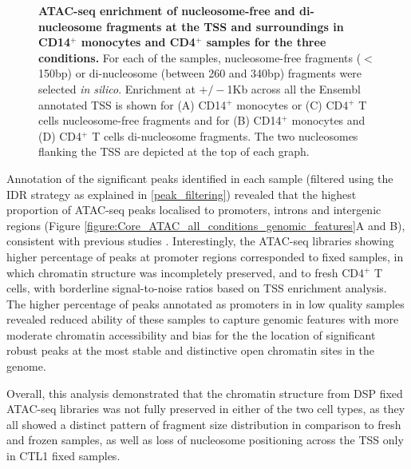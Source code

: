 \begin{figure}[htbp]
\caption[ATAC-seq enrichment of nucleosome-free and di-nucleosome fragments at the TSS and surroundings in CD14$^+$ monocytes and CD4$^+$ samples for the three conditions.]{\textbf{ATAC-seq enrichment of nucleosome-free and di-nucleosome fragments at the TSS and surroundings in CD14$^+$ monocytes and CD4$^+$ samples for the three conditions.} For each of the samples, nucleosome-free fragments ($<$150bp) or di-nucleosome (between 260 and 340bp) fragments were selected \textit{in silico}. Enrichment at $+/-$1Kb across all the Ensembl annotated TSS is shown for (A) CD14$^+$ monocytes or (C) CD4$^+$ T cells nucleosome-free fragments and for (B) CD14$^+$ monocytes and (D) CD4$^+$ T cells di-nucleosome fragments. The two nucleosomes flanking the TSS are depicted at the top of each graph.}
\label{figure:Core_ATAC_intra_dinucleosome_tss_enrichment}
\end{figure}



Annotation of the significant peaks identified in each sample (filtered using the IDR strategy as explained in \ref{peak_filtering}) revealed that the highest proportion of ATAC-seq peaks localised to promoters, introns and intergenic regions (Figure \ref{figure:Core_ATAC_all_conditions_genomic_features}A and B), consistent with previous studies \parencite{Buenrostro2013,Scharer2016}. Interestingly, the ATAC-seq libraries showing higher percentage of peaks at promoter regions corresponded to fixed samples, in which chromatin structure was incompletely preserved, and to fresh CD4$^+$ T cells, with borderline signal-to-noise ratios based on TSS enrichment analysis. The higher percentage of peaks annotated as promoters in in low quality samples revealed reduced ability of these samples to capture genomic features with more moderate chromatin accessibility and bias for the the location of significant robust peaks at the most stable and distinctive open chromatin sites in the genome.

Overall, this analysis demonstrated that the chromatin structure from DSP fixed ATAC-seq libraries was not fully preserved in either of the two cell types, as they all showed a distinct pattern of fragment size distribution in comparison to fresh and frozen samples, as well as loss of nucleosome positioning across the TSS only in CTL1 fixed samples. 

